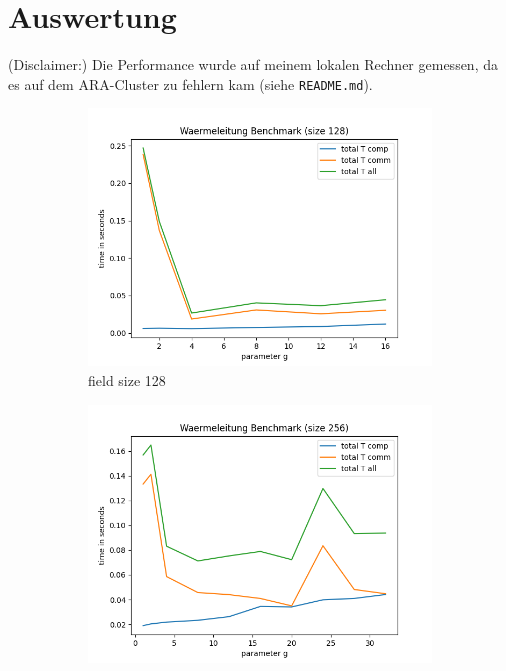\documentclass[12pt]{article}
\begin{document}
\clearpage
\section{Auswertung}
(Disclaimer:) Die Performance wurde auf meinem lokalen Rechner gemessen, da es auf dem ARA-Cluster zu fehlern kam (siehe \verb+README.md+).

\begin{figure}[!htb]
    \begin{subfigure}{0.5\textwidth}
        \centering
        \includegraphics[scale=0.5]{../benchmark/plots/plot_total_128.png}
        \caption{field size 128}\label{fig:plot_128_tot}
    \end{subfigure}
	\begin{subfigure}{0.5\textwidth}
        \centering
        \includegraphics[scale=0.5]{../benchmark/plots/plot_total_256.png}

\end{subfigure}
\end{figure}
\end{document}
